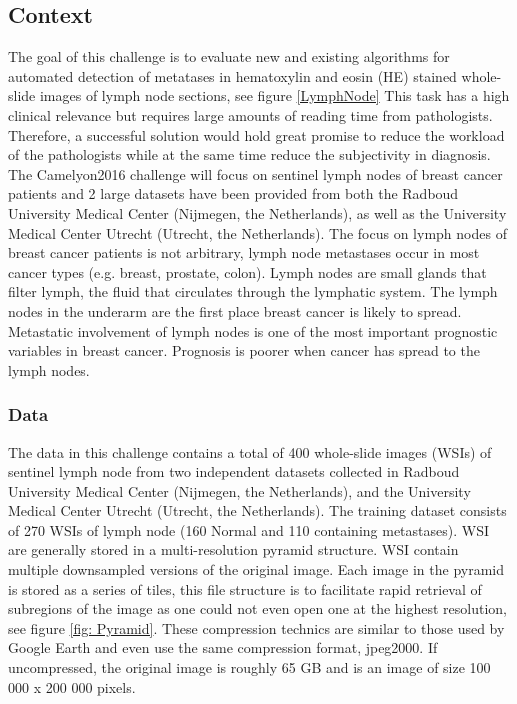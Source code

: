 \documentclass{article}
\begin{document}
\subsection{Context}
The goal of this challenge is to evaluate new and existing algorithms for automated detection of metatases in hematoxylin and eosin (HE) stained whole-slide images of lymph node sections, see figure \ref{LymphNode} This task has a high clinical relevance but requires large amounts of reading time from pathologists. Therefore, a successful solution would hold great promise to reduce the workload of the pathologists while at the same time reduce the subjectivity in diagnosis. The Camelyon2016 challenge will focus on sentinel lymph nodes of breast cancer patients and 2 large datasets have been provided from both the Radboud University Medical Center (Nijmegen, the Netherlands), as well as the University Medical Center Utrecht (Utrecht, the Netherlands). The focus on lymph nodes of breast cancer patients is not arbitrary, lymph node metastases occur in most cancer types (e.g. breast, prostate, colon). Lymph nodes are small glands that filter lymph, the fluid that circulates through the lymphatic system. The lymph nodes in the underarm are the first place breast cancer is likely to spread. Metastatic involvement of lymph nodes is one of the most important prognostic variables in breast cancer. Prognosis is poorer when cancer has spread to the lymph nodes.
\subsubsection*{Data}
The data in this challenge contains a total of 400 whole-slide images (WSIs) of sentinel lymph node from two independent datasets collected in Radboud University Medical Center (Nijmegen, the Netherlands), and the University Medical Center Utrecht (Utrecht, the Netherlands). The training dataset consists of 270 WSIs of lymph node (160 Normal and 110 containing metastases). WSI are generally stored in a multi-resolution pyramid structure. WSI contain multiple downsampled versions of the original image. Each image in the pyramid is stored as a series of tiles, this file structure is to facilitate rapid retrieval of subregions of the image as one could not even open one at the highest resolution, see figure \ref{fig: Pyramid}. These compression technics are similar to those used by Google Earth and even use the same compression format, jpeg2000. If uncompressed, the original image is roughly 65 GB and is an image of size 100 000 x 200 000 pixels.
\end{document}
